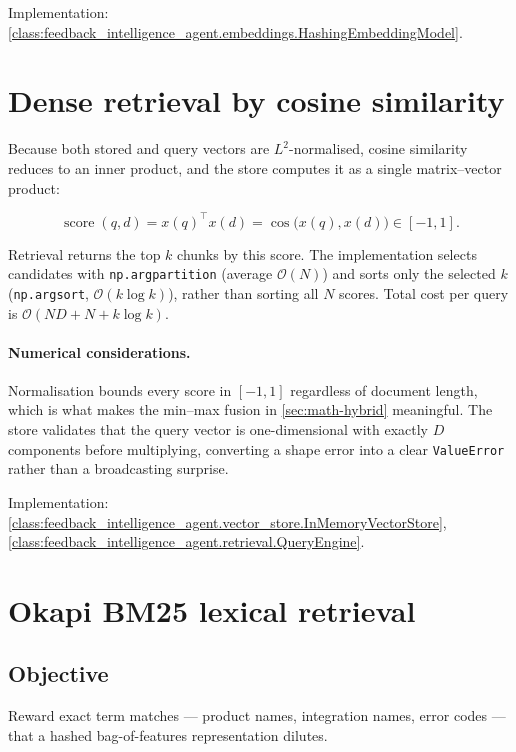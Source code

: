 \medskip\noindent
Implementation: \cref{class:feedback_intelligence_agent.embeddings.HashingEmbeddingModel}.

\section{Dense retrieval by cosine similarity}
\label{sec:math-dense}

Because both stored and query vectors are $L^2$-normalised, cosine similarity
reduces to an inner product, and the store computes it as a single
matrix--vector product:

\begin{equation}
\operatorname{score}(q, d) = x(q)^{\top} x(d)
 = \cos\!\big(x(q), x(d)\big) \in [-1, 1].
\end{equation}

Retrieval returns the top $k$ chunks by this score. The implementation selects
candidates with \texttt{np.argpartition} (average $\mathcal{O}(N)$) and sorts
only the selected $k$ (\texttt{np.argsort}, $\mathcal{O}(k \log k)$), rather
than sorting all $N$ scores. Total cost per query is
$\mathcal{O}(ND + N + k\log k)$.

\paragraph{Numerical considerations.}
Normalisation bounds every score in $[-1,1]$ regardless of document length,
which is what makes the min--max fusion in \cref{sec:math-hybrid} meaningful.
The store validates that the query vector is one-dimensional with exactly $D$
components before multiplying, converting a shape error into a clear
\texttt{ValueError} rather than a broadcasting surprise.

\medskip\noindent
Implementation: \cref{class:feedback_intelligence_agent.vector_store.InMemoryVectorStore},
\cref{class:feedback_intelligence_agent.retrieval.QueryEngine}.

\section{Okapi BM25 lexical retrieval}
\label{sec:math-bm25}

\subsection*{Objective}

Reward exact term matches --- product names, integration names, error codes ---
that a hashed bag-of-features representation dilutes.

